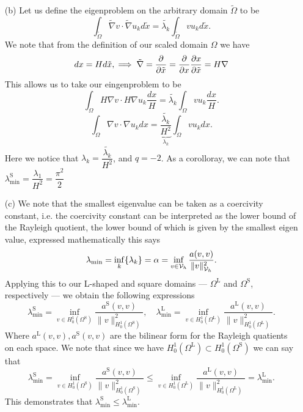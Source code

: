 \documentclass{article}
\begin{document}
\begin{itemize}
	\item[(b)] Let us define the eigenproblem on the arbitrary domain \(\tilde{\Omega} \) to be
	\begin{equation*}
		\int_{\tilde{\Omega}} \tilde{\nabla}v \cdot \tilde{\nabla}u_kd\tilde{x} = \tilde{\lambda_k}\int_{\tilde{\Omega}} v u_kd\tilde{x}.
	\end{equation*}
	We note that from the definition of our scaled domain \(\Omega \) we have 
	\begin{equation*}
		dx = Hd\tilde{x}, \implies \tilde{\nabla} = \frac{\partial }{\partial \tilde{x}} = \frac{\partial }{\partial x}\frac{\partial x}{\partial \tilde{x}} = H\nabla
	\end{equation*}
	This allows us to take our eingenproblem to be
	\begin{equation*}
		\int_{\Omega} H\nabla v \cdot H\nabla u_k\dfrac{dx}{H} = \tilde{\lambda_k}\int_{\Omega} v u_k\dfrac{dx}{H}.
	\end{equation*}
	\begin{equation*}
		\int_{\Omega} \nabla v \cdot \nabla u_k dx = \underbrace{\dfrac{\tilde{\lambda_k}}{H^2}}_{\lambda_k}\int_{\Omega} v u_k dx.
	\end{equation*}
	Here we notice that \(\lambda_k = \dfrac{\tilde{\lambda_k}}{H^2} \), and \(q = -2\). As a corolloray, we can note that \(\lambda_\text{min}^\text{S} = \dfrac{\lambda_1}{H^2} = \dfrac{\pi^2}{2} \)
	
	\item[(c)] We note that the smallest eigenvalue can be taken as a coercivity constant, i.e. the coercivity constant can be interpreted as the lower bound of the Rayleigh quotient, the lower bound of which is given by the smallest eigen value, expressed mathematically this says
	\begin{equation*}
		\lambda_\text{min} = \inf_k\{\lambda_k\} = \alpha = \inf\limits_{v\in\mathcal{V}_h}\dfrac{a(v,v)}{\|v\|^2_{\mathcal{V}_h}}.
	\end{equation*}
	Applying this to our L-shaped and square domains --- \(\Omega^\text{L}\) and \(\Omega^\text{S} \), respectively --- we obtain the following expressions
	\begin{equation*}
		\lambda_\text{min}^\text{S} = \inf\limits_{v\in H^1_0(\Omega^\text{S})}\dfrac{a^\text{S}(v,v)}{\|v\|^2_{H^1_0(\Omega^\text{S})}}, \quad \lambda_\text{min}^\text{L} = \inf\limits_{v\in H^1_0(\Omega^\text{L})}\dfrac{a^\text{L}(v,v)}{\|v\|^2_{H^1_0(\Omega^\text{L})}}.
	\end{equation*}
	Where \(a^\text{L}(v,v), a^\text{S}(v,v) \) are the bilinear form for the Rayleigh quatients on each space. We note that since we have \(H^1_0(\Omega^\text{L}) \subset H^1_0(\Omega^\text{S}) \) we can say that
	\begin{equation*}
		\lambda_\text{min}^\text{S} = \inf\limits_{v\in H^1_0(\Omega^\text{S})}\dfrac{a^\text{S}(v,v)}{\|v\|^2_{H^1_0(\Omega^\text{S})}} \leq   \inf\limits_{v\in H^1_0(\Omega^\text{L})}\dfrac{a^\text{L}(v,v)}{\|v\|^2_{H^1_0(\Omega^\text{L})}} = \lambda_\text{min}^\text{L}.
	\end{equation*}
	This demonstrates that \(\lambda_\text{min}^\text{S} \leq \lambda_\text{min}^\text{L} \).
	

\end{itemize}
\end{document}

